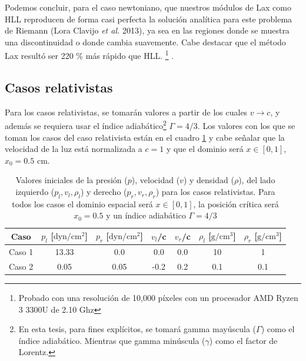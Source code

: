 \documentclass[12pt,a4paper]{book}
\begin{document}

Podemos concluir, para el caso newtoniano, que nuestros módulos de 
Lax como HLL reproducen de forma casi perfecta la solución analítica para este 
problema de Riemann
(Lora Clavijo \emph{et al.} 2013), ya sea en las regiones donde se muestra una discontinuidad
o donde cambia suavemente. 
Cabe destacar que el método Lax resultó ser 220 \% más rápido que HLL. 
\footnote{Probado con una resolución de 10,000 píxeles con un procesador AMD Ryzen 3 3300U de
2.10 Ghz} 
.



\subsection{Casos relativistas}

Para los casos relativistas, se tomarán valores a partir de los cuales $v \rightarrow c$,
y además se requiera usar el índice adiabático\footnote{En esta tesis,
para fines explícitos, se tomará gamma mayúscula ($\Gamma$) como el índice adiabático. Mientras que 
gamma minúscula ($\gamma$) como el factor de Lorentz.} $\Gamma = 4/3$. Los valores con los que se 
toman los casos del caso relativista están en el cuadro \ref{Cuadro_parametros_sod_tube_rel} y 
cabe señalar que la velocidad de la luz está normalizada a $c = 1$  y que el dominio
será $x \in [0,1]$, $x_0 = 0.5$ cm.

\begin{table}[htbp]
  \begin{center}
  \begin{tabular}{|c|c|c|c|c|c|c|}
  \hline 
  \textbf{Caso} & \textbf{$p_l$} [$\text{dyn}/\text{cm}^2$] & \textbf{$p_r$} [$\text{dyn}/\text{cm}^2$] & \textbf{$v_l$}/c & \textbf{$v_r$}/c  & \textbf{$\rho_l$} [$\text{g}/\text{cm}^3$]& \textbf{$\rho_r$} [$\text{g}/\text{cm}^3$]\\ 
  \hline 
  Caso 1 & 13.33  & 0.0  & 0.0 & 0.0 & 10  & 1 \\ 
  \hline 
  Caso 2 & 0.05  & 0.05  & -0.2 & 0.2 & 0.1  & 0.1  \\ 
  \hline 
  \end{tabular}
  \caption{\label{Cuadro_parametros_sod_tube_rel} Valores iniciales 
  de la presión ($p$), velocidad ($v$)
  y densidad ($\rho$), del lado izquierdo ($p_l, v_l, \rho_l$) y derecho ($p_r, v_r, \rho_r$)
  para los casos relativistas. Para todos los
  casos el dominio espacial será $x \in [0,1]$, la 
  posición crítica será $x_0 = 0.5$ y un índice adiabático $\Gamma = 4/3$}
  \end{center}
\end{table}
\end{document}
